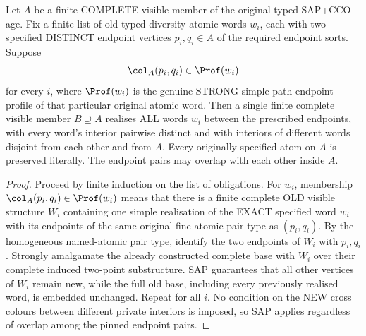 \begin{lemma}
\label{lem:typed-simultaneous-word-insertion}
Let \(A\) be a finite COMPLETE
visible member of the original
typed SAP+CCO age. Fix a finite
list of old typed diversity
atomic words \(w_i\), each
with two specified DISTINCT
endpoint vertices \(p_i,q_i\in A\)
of the required endpoint sorts.
Suppose
\[
 \col_A(p_i,q_i)\in\Prof(w_i)
\]
for every \(i\), where
\(\Prof(w_i)\) is the genuine
STRONG simple-path endpoint
profile of that particular
original atomic word.
Then a single finite complete
visible member \(B\supseteq A\)
realises ALL words \(w_i\)
between the prescribed endpoints,
with every word's interior
pairwise distinct and with
interiors of different words
disjoint from each other and
from \(A\). Every originally
specified atom on \(A\) is
preserved literally. The
endpoint pairs may overlap
with each other inside \(A\).
\end{lemma}
\begin{proof}
Proceed by finite induction
on the list of obligations.
For \(w_i\), membership
\(\col_A(p_i,q_i)\in\Prof(w_i)\)
means that there is a finite
complete OLD visible structure
\(W_i\) containing one
simple realisation of
the EXACT specified word
\(w_i\) with its endpoints
of the same original fine
atomic pair type as
\((p_i,q_i)\).
By the homogeneous
named-atomic pair type,
identify the two endpoints
of \(W_i\) with \(p_i,q_i\).
Strongly amalgamate the
already constructed complete
base with \(W_i\) over
their complete induced
two-point substructure.
SAP guarantees that all
other vertices of \(W_i\)
remain new, while the full
old base, including every
previously realised word,
is embedded unchanged.
Repeat for all \(i\).
No condition on the NEW
cross colours between
different private interiors
is imposed, so SAP applies
regardless of overlap among
the pinned endpoint pairs.
\end{proof}

